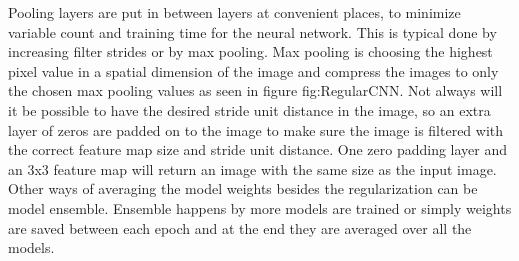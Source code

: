 \FloatBarrier

Pooling layers are put in between layers at convenient places, to minimize variable count and training time for the neural network. This is typical done by increasing filter strides or by max pooling. Max pooling is choosing the highest pixel value in a spatial dimension of the image and compress the images to only the chosen max pooling values as seen in figure fig:RegularCNN. Not always will it be possible to have the desired stride unit distance in the image, so an extra layer of zeros are padded on to the image to make sure the image is filtered with the correct feature map size and stride unit distance. One zero padding layer and an 3x3 feature map will return an image with the same size as the input image. Other ways of averaging the model weights besides the regularization can be model ensemble. Ensemble happens by more models are trained or simply weights are saved between each epoch and at the end they are averaged over all the models.   

\FloatBarrier

